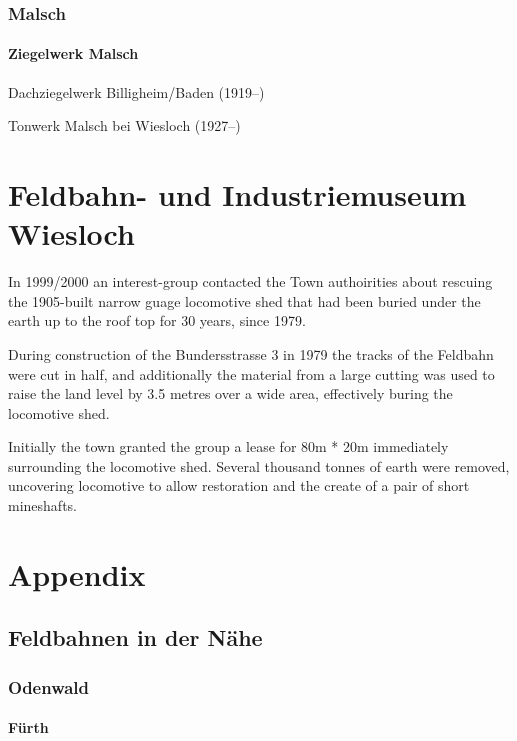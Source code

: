 \documentclass[a4paper]{report}
\begin{document}
\section{Malsch}

\subsection{Ziegelwerk Malsch}

Dachziegelwerk Billigheim/Baden (1919--)

Tonwerk Malsch bei Wiesloch (1927--)

\part{Feldbahn- und Industriemuseum Wiesloch}

In 1999/2000 an interest-group contacted the Town authoirities about
rescuing the 1905-built narrow guage locomotive shed that had been
buried under the earth up to the roof top for 30 years, since 1979.

During construction of the Bundersstrasse 3 in 1979 the tracks of the Feldbahn were cut in half, and additionally the material from a large cutting was used to raise the land level by 3.5 metres over a wide area, effectively buring the locomotive shed.

Initially the town granted the group a lease for 80m * 20m immediately
surrounding the locomotive shed.  Several thousand tonnes of earth
were removed, uncovering locomotive to allow restoration and the
create of a pair of short mineshafts.

\part{Appendix}

\chapter{Feldbahnen in der Nähe}

\section{Odenwald}

\subsection{Fürth}
\end{document}
